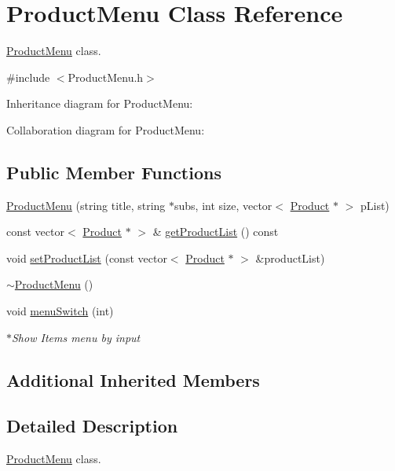\hypertarget{classProductMenu}{}\section{Product\+Menu Class Reference}
\label{classProductMenu}


\hyperlink{classProductMenu}{Product\+Menu} class.  




{\ttfamily \#include $<$Product\+Menu.\+h$>$}



Inheritance diagram for Product\+Menu\+:


Collaboration diagram for Product\+Menu\+:
\subsection*{Public Member Functions}
\begin{DoxyCompactItemize}
\item 
\hyperlink{classProductMenu_a3983fa9a21b0fdee2165ecee63c65789}{Product\+Menu} (string title, string $\ast$subs, int size, vector$<$ \hyperlink{classProduct}{Product} $\ast$ $>$ p\+List)
\item 
const vector$<$ \hyperlink{classProduct}{Product} $\ast$ $>$ \& \hyperlink{classProductMenu_a4f0609d8e1adaf479e339b11ff81becd}{get\+Product\+List} () const 
\item 
void \hyperlink{classProductMenu_a2c7a0b496eba98d6aa26fcc0772a1fff}{set\+Product\+List} (const vector$<$ \hyperlink{classProduct}{Product} $\ast$ $>$ \&product\+List)
\item 
\hyperlink{classProductMenu_aaf9c9ffabcacddc2d76319845077186d}{$\sim$\+Product\+Menu} ()
\item 
void \hyperlink{classProductMenu_a24a18c11760a828b7b7de4acc22bcce5}{menu\+Switch} (int)
\begin{DoxyCompactList}\small\item\em $\ast$\+Show Items menu by input \end{DoxyCompactList}\end{DoxyCompactItemize}
\subsection*{Additional Inherited Members}


\subsection{Detailed Description}
\hyperlink{classProductMenu}{Product\+Menu} class. 

